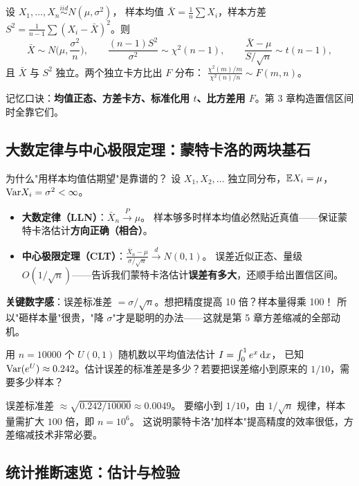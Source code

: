 设 $X_1,\dots,X_n\overset{iid}{\sim}N(\mu,\sigma^2)$，
样本均值 $\bar X=\frac1n\sum X_i$，样本方差 $S^2=\frac{1}{n-1}\sum(X_i-\bar X)^2$。则
\[
\bar X\sim N\Big(\mu,\frac{\sigma^2}{n}\Big),\qquad
\frac{(n-1)S^2}{\sigma^2}\sim\chi^2(n-1),\qquad
\frac{\bar X-\mu}{S/\sqrt n}\sim t(n-1),
\]
且 $\bar X$ 与 $S^2$ 独立。两个独立卡方比出 $F$ 分布：
$\frac{\chi^2(m)/m}{\chi^2(n)/n}\sim F(m,n)$。

记忆口诀：\textbf{均值正态、方差卡方、标准化用 $t$、比方差用 $F$}。第 3 章构造置信区间时全靠它们。

\subsection{大数定律与中心极限定理：蒙特卡洛的两块基石}

\begin{kbox}{为什么"用样本均值估期望"是靠谱的？}
设 $X_1,X_2,\dots$ 独立同分布，$\mathbb{E} X_i=\mu$，$\mathrm{Var} X_i=\sigma^2<\infty$。
\begin{itemize}[leftmargin=2em]
  \item \textbf{大数定律（LLN）}：$\bar X_n\xrightarrow{P}\mu$。
  样本够多时样本均值必然贴近真值——保证蒙特卡洛估计\textbf{方向正确（相合）}。
  \item \textbf{中心极限定理（CLT）}：$\frac{\bar X_n-\mu}{\sigma/\sqrt n}\xrightarrow{d}N(0,1)$。
  误差近似正态、量级 $O(1/\sqrt n)$——告诉我们蒙特卡洛估计\textbf{误差有多大}，还顺手给出置信区间。
\end{itemize}
\textbf{关键数字感}：误差标准差 $=\sigma/\sqrt n$。想把精度提高 10 倍？样本量得乘 100！
所以"砸样本量"很贵，"降 $\sigma$"才是聪明的办法——这就是第 5 章方差缩减的全部动机。
\end{kbox}

\begin{exbox}[蒙特卡洛误差估算]
用 $n=10000$ 个 $U(0,1)$ 随机数以平均值法估计 $I=\int_0^1 e^x\,\mathrm{d} x$，
已知 $\mathrm{Var}(e^U)\approx0.242$。估计误差的标准差是多少？若要把误差缩小到原来的 $1/10$，需要多少样本？
\end{exbox}
\begin{sol}
误差标准差 $\approx\sqrt{0.242/10000}\approx0.0049$。
要缩小到 $1/10$，由 $1/\sqrt n$ 规律，样本量需扩大 $100$ 倍，即 $n=10^6$。
这说明蒙特卡洛"加样本"提高精度的效率很低，方差缩减技术非常必要。
\end{sol}

\subsection{统计推断速览：估计与检验}


